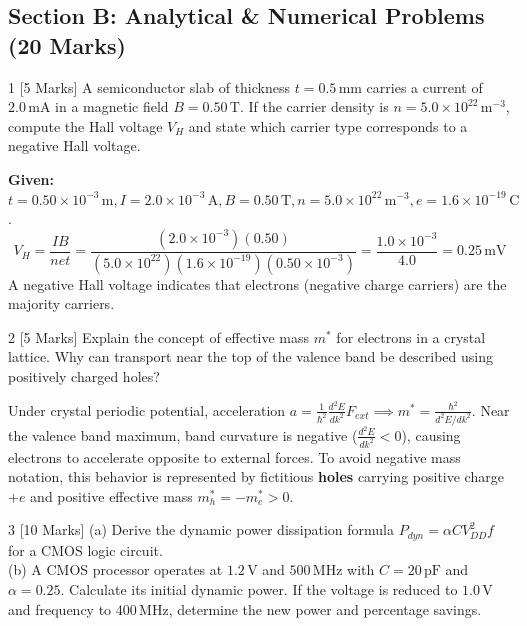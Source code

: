 \subsection*{Section B: Analytical \& Numerical Problems (20 Marks)}

\begin{examqbox}{1 [5 Marks]}
A semiconductor slab of thickness $t = 0.5\,\text{mm}$ carries a current of $2.0\,\text{mA}$ in a magnetic field $B = 0.50\,\text{T}$. If the carrier density is $n = 5.0 \times 10^{22}\,\text{m}^{-3}$, compute the Hall voltage $V_H$ and state which carrier type corresponds to a negative Hall voltage.
\end{examqbox}

\begin{solbox}
\textbf{Given:} $t = 0.50 \times 10^{-3}\,\text{m}, I = 2.0 \times 10^{-3}\,\text{A}, B = 0.50\,\text{T}, n = 5.0 \times 10^{22}\,\text{m}^{-3}, e = 1.6 \times 10^{-19}\,\text{C}$.
\begin{equation}
V_H = \frac{I B}{n e t} = \frac{(2.0 \times 10^{-3})(0.50)}{(5.0 \times 10^{22})(1.6 \times 10^{-19})(0.50 \times 10^{-3})} = \frac{1.0 \times 10^{-3}}{4.0} = 0.25\,\text{mV}
\end{equation}
A negative Hall voltage indicates that electrons (negative charge carriers) are the majority carriers.
\end{solbox}

\begin{examqbox}{2 [5 Marks]}
Explain the concept of effective mass $m^*$ for electrons in a crystal lattice. Why can transport near the top of the valence band be described using positively charged holes?
\end{examqbox}

\begin{solbox}
Under crystal periodic potential, acceleration $a = \frac{1}{\hbar^2}\frac{d^2E}{dk^2} F_{ext} \implies m^* = \frac{\hbar^2}{d^2E/dk^2}$. Near the valence band maximum, band curvature is negative ($\frac{d^2E}{dk^2} < 0$), causing electrons to accelerate opposite to external forces. To avoid negative mass notation, this behavior is represented by fictitious \textbf{holes} carrying positive charge $+e$ and positive effective mass $m_h^* = -m_e^* > 0$.
\end{solbox}

\begin{examqbox}{3 [10 Marks]}
(a) Derive the dynamic power dissipation formula $P_{dyn} = \alpha C V_{DD}^2 f$ for a CMOS logic circuit.\\
(b) A CMOS processor operates at $1.2\,\text{V}$ and $500\,\text{MHz}$ with $C=20\,\text{pF}$ and $\alpha=0.25$. Calculate its initial dynamic power. If the voltage is reduced to $1.0\,\text{V}$ and frequency to $400\,\text{MHz}$, determine the new power and percentage savings.
\end{examqbox}

